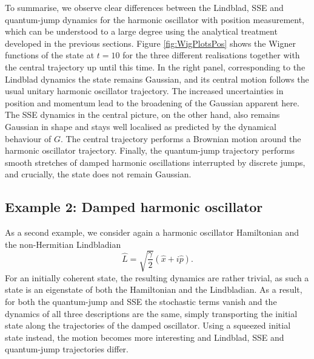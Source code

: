 \documentclass[12pt]{iopart} %
\begin{document}
To summarise, we observe clear differences between the Lindblad, SSE and quantum-jump dynamics for the harmonic oscillator with position measurement, which can be understood to a large degree using the analytical treatment developed in the previous sections. Figure \ref{fig:WigPlotsPos} shows the Wigner functions of the state at $t=10$ for the three different realisations together with the central trajectory up until this time. In the right panel, corresponding to the Lindblad dynamics the state remains Gaussian, and its central motion follows the usual unitary harmonic oscillator trajectory. The increased uncertainties in position and momentum lead to the broadening of the Gaussian apparent here. The SSE dynamics in the central picture, on the other hand, also remains Gaussian in shape and stays well localised as predicted by the dynamical behaviour of $G$. The central trajectory performs a Brownian motion around the harmonic oscillator trajectory. Finally, the quantum-jump trajectory performs smooth stretches of damped harmonic oscillations interrupted by discrete jumps, and crucially, the state does not remain Gaussian.  

\FloatBarrier
\subsection{Example 2: Damped harmonic oscillator}
As a second example, we consider again a harmonic oscillator Hamiltonian and the non-Hermitian Lindbladian
\begin{equation} \label{eq:AnhModel}
\hat L=\sqrt{\frac{\gamma}{2}}(\hat x+i \hat p).
\end{equation}
For an initially coherent state, the resulting dynamics are rather trivial, as such a state is an eigenstate of both the Hamiltonian and the Lindbladian. As a result, for both the quantum-jump and SSE the stochastic terms vanish and the dynamics of all three descriptions are the same, simply transporting the initial state along the trajectories of the damped oscillator. Using a squeezed initial state instead, the motion becomes more interesting and Lindblad, SSE and quantum-jump trajectories differ.  
\end{document}
